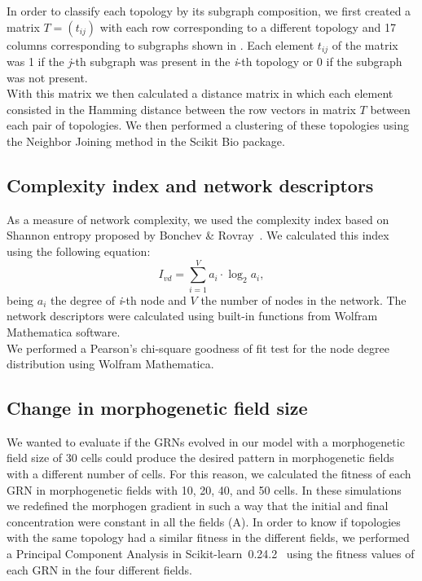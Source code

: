 \documentclass[10pt,letterpaper]{article}
\begin{document}
In order to classify each topology by its subgraph composition, we first created
a matrix  $T = (t_{ij})$ with each row corresponding to a different topology
and 17 columns corresponding to subgraphs shown in .
Each element $t_{ij}$ of
the matrix was 1 if the \emph{j}-th subgraph was present in the \emph{i}-th
topology or 0 if the subgraph was not present.\\

With this matrix we then calculated a distance matrix in which each element
consisted in the Hamming distance between the row vectors in matrix $T$ between
each pair of topologies. We then performed a clustering of these topologies
using the Neighbor Joining method in the Scikit Bio package.

\subsection*{Complexity index and network descriptors}

As a measure of network complexity, we used the complexity index based on
Shannon entropy proposed by Bonchev \& Rovray~\cite{D.2005}. We calculated this
index using the following equation:
\begin{equation}
 I_{vd} = \sum_{i=1}^V a_i \cdot \log_{2} a_i,
\end{equation}
\noindent
being $a_i$ the degree of \emph{i}-th node and $V$ the number of nodes in the
network. The network descriptors were calculated using built-in functions from
Wolfram Mathematica software.\\

We performed a Pearson’s chi-square goodness of fit test for the node degree
distribution using Wolfram Mathematica.

\subsection*{Change in morphogenetic field size}
We wanted to evaluate if the GRNs evolved in our model with a morphogenetic
field size of 30 cells could produce the desired pattern in morphogenetic fields
with a different number of cells. For this reason, we calculated the fitness of
each GRN in morphogenetic fields with 10, 20, 40, and 50 cells. In these
simulations we redefined the morphogen gradient in such a way that the initial
and final concentration were constant in all the fields (A).
In order to know if topologies with the same topology had a similar fitness
in the different fields, we performed a Principal Component Analysis in
Scikit-learn~0.24.2~\cite{sklearn} using the fitness values of each GRN in
the four different fields.
\end{document}
